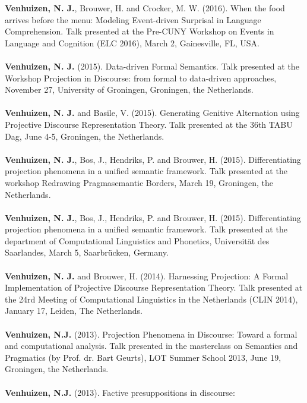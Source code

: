 \documentclass[a4paper,10pt]{article}
\begin{document}
\noindent
    \textbf{Venhuizen, N. J.}, Brouwer, H. and Crocker, M. W. (2016). When the
    food arrives before the menu: Modeling Event-driven Surprisal in Language
    Comprehension. Talk presented at the Pre-CUNY Workshop on Events in
    Language and Cognition (ELC 2016), March 2, Gainesville, FL, USA.\\
    \\
    \textbf{Venhuizen, N. J.} (2015). Data-driven Formal Semantics. Talk
    presented at the Workshop Projection in Discourse: from formal to
    data-driven approaches, November 27, University of Groningen, Groningen,
    the Netherlands.\\
    \\
    \textbf{Venhuizen, N. J.} and Basile, V. (2015). Generating Genitive
    Alternation using Projective Discourse Representation Theory.
    Talk presented at the 36th TABU Dag, June 4-5, Groningen, the Netherlands.\\
    \\
    \textbf{Venhuizen, N. J.}, Bos, J., Hendriks, P. and Brouwer, H. (2015). 
    Differentiating projection phenomena in a unified semantic framework.
    Talk presented at the workshop Redrawing Pragmasemantic Borders,
    March 19, Groningen, the Netherlands.\\
    \\
    \textbf{Venhuizen, N. J.}, Bos, J., Hendriks, P. and Brouwer, H. (2015). 
    Differentiating projection phenomena in a unified semantic framework.
    Talk presented at the department of Computational Linguistics and Phonetics,
    Universit{\"a}t des Saarlandes, March 5, Saarbr{\"u}cken, Germany.\\
    \\
    \textbf{Venhuizen, N. J.} and Brouwer, H. (2014). Harnessing Projection: A Formal
    Implementation of Projective Discourse Representation Theory. Talk
    presented at the 24rd Meeting of Computational Linguistics in the
    Netherlands (CLIN 2014), January 17, Leiden, The Netherlands.\\
    \\
    \textbf{Venhuizen, N.J.} (2013). Projection Phenomena in Discourse: Toward
    a formal and computational analysis. Talk
    presented in the masterclass on Semantics and Pragmatics (by Prof. dr. Bart
    Geurts), LOT Summer School 2013, June 19, Groningen, the Netherlands.\\
    \\
    \textbf{Venhuizen, N.J.} (2013). Factive presuppositions in discourse:
\end{document}
